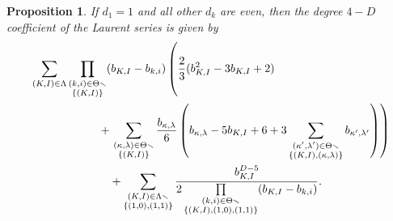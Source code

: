 \documentclass{amsart}
\newtheorem{proposition}[theorem]{Proposition}
\theoremstyle{definition}
\theoremstyle{remark}
\begin{document}
\begin{proposition}
If $d_1 = 1$ and all other $d_k$ are even, then the degree $4-D$ coefficient of the
Laurent series is given by
\begin{align}
    \label{eq:Gamma1FirstCase2}
    &\sum\limits_{(K,I)\in\Lambda}
         {\prod\limits_{\substack{(k,i)\in\Theta\smallsetminus \\ \{(K,I)\}}} (b_{K,I} - b_{k,i})}
        \left(
        \vphantom{\sum\limits_{\substack{(\kappa^\prime,\lambda^\prime)\in\Theta\smallsetminus
                            \\ \{(K,I),(\kappa,\lambda)\}}} b_{\kappa^\prime,\lambda^\prime}}
        \frac{2}{3} (b_{K,I}^2 - 3b_{K,I} + 2)
                \right.
                \\ \nonumber
                &\quad\quad\quad\quad\quad\quad + \left.
                \sum\limits_{\substack{(\kappa,\lambda)\in\Theta\smallsetminus \\ \{(K,I)\}}}
                    \frac{b_{\kappa,\lambda}}{6} \left(
                        b_{\kappa,\lambda} - 5b_{K,I} + 6 + 3
                    \sum\limits_{\substack{(\kappa^\prime,\lambda^\prime)\in\Theta\smallsetminus
                            \\ \{(K,I),(\kappa,\lambda)\}}} b_{\kappa^\prime,\lambda^\prime}
        \right)\right)
    \\ \nonumber &\quad\quad\quad\quad\quad\quad\quad
        +   \sum\limits_{\substack{(K,I)\in\Lambda\smallsetminus \\ \{ (1,0), (1,1) \} }}
            \frac{ b_{K,I}^{D-5} }
                { 2 \prod\limits_{\substack{(k,i)\in\Theta\smallsetminus \\ \{ (K,I), (1,0), (1,1) \} }}
                    (b_{K,I}-b_{k,i})}.
\end{align}
\end{proposition}
\end{document}

